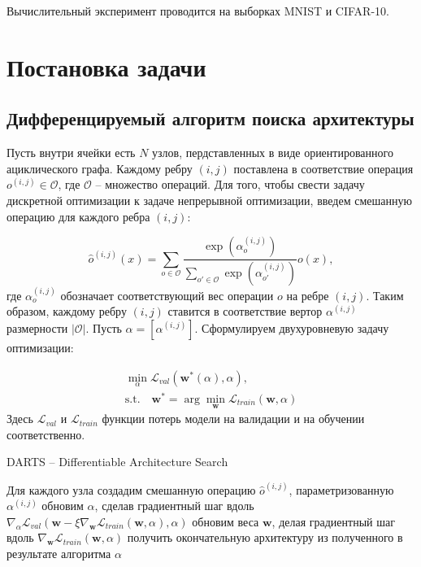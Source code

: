 \documentclass[12pt, twoside]{article}
\begin{document}
Вычислительный эксперимент проводится на выборках MNIST\cite{lecun-mnisthandwrittendigit-2010} и CIFAR-10\cite{cif}.

\section{Постановка задачи}

\subsection{Дифференцируемый алгоритм поиска архитектуры}

 Пусть внутри ячейки есть $N$ узлов, пердставленных в виде ориентированного ациклического графа. Каждому ребру $(i, j)$ поставлена в соответствие операция $o^{(i, j)} \in \mathcal{O}$, где $\mathcal{O}$ -- множество операций. Для того, чтобы свести задачу дискретной оптимизации к задаче непрерывной оптимизации, введем смешанную операцию для каждого ребра $(i, j)$:

\begin{equation}
\hat{o}^{(i, j)}(x) = \sum_{o\in \mathcal{O}} \frac{\exp(\alpha_o^{(i, j)})}{\sum_{o'\in\mathcal{O}} \exp(\alpha_{o'}^{(i, j)})}o(x),
\end{equation}
где $\alpha_o^{(i, j)}$ обозначает соответствующий вес операции $o$ на ребре $(i, j)$. Таким образом, каждому ребру $(i, j)$ ставится в соответствие вертор $\alpha^{(i, j)}$ размерности $|\mathcal{O}|$. Пусть $\alpha = [\alpha^{(i, j)}]$. Сформулируем двухуровневую задачу оптимизации:

\begin{equation}
\begin{aligned}
\min_{\alpha}\mathcal{L}_{val}(\mathbf{w}^*(\alpha), \alpha),\\
 \mathrm{s.t.}\quad \mathbf{w}^* = \arg\min_{\mathbf{w}}\mathcal{L}_{train}(\mathbf{w}, \alpha)
 \end{aligned}
\end{equation}
Здесь $\mathcal{L}_{val}$ и $\mathcal{L}_{train}$ функции потерь модели на валидации и на обучении соответственно.


\begin{algorithm}[H]
\begin{algorithmic}[1]
\caption{DARTS -- Differentiable Architecture Search}
\STATE Для каждого узла создадим смешанную операцию $\hat{o}^{(i, j)}$, параметризованную $\alpha^{(i, j)}$
\STATE  обновим $\alpha$, сделав градиентный шаг вдоль $\nabla_\alpha \mathcal{L}_{val}(\mathbf{w} - \xi\nabla_{\mathbf{w}}\mathcal{L}_{train}(\mathbf{w}, \alpha), \alpha)$
\STATE обновим веса $\mathbf{w}$, делая градиентный шаг вдоль $\nabla_\mathbf{w}\mathcal{L}_{train}(\mathbf{w}, \alpha)$
\ENDWHILE
\STATE получить окончательную архитектуру из полученного в результате алгоритма $\alpha$
\end{algorithmic}
\end{algorithm}
\end{document}
